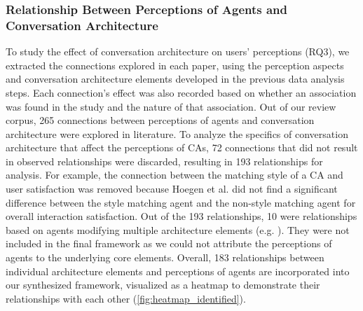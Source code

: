 \subsubsection*{Relationship Between Perceptions of Agents and Conversation Architecture}



To study the effect of conversation architecture on users' perceptions (RQ3), we extracted the connections explored in each paper, using the perception aspects and conversation architecture elements developed in the previous data analysis steps. Each connection's effect was also recorded based on whether an association was found in the study and the nature of that association. Out of our review corpus, 265 connections between perceptions of agents and conversation architecture were explored in literature. To analyze the specifics of conversation architecture that affect the perceptions of CAs, 72 connections that did not result in observed relationships were discarded, resulting in 193 relationships for analysis. For example, the connection between the matching style of a CA and user satisfaction was removed because Hoegen et al. \cite{hoegen2019end}\cmt{[31]} did not find a significant difference between the style matching agent and the non-style matching agent for overall interaction satisfaction. Out of the 193 relationships, 10 were relationships based on agents modifying multiple architecture elements (e.g. \cite{seeger2021chatbots, volkel2021manipulating}\cmt{[35][68]}). They were not included in the final framework as we could not attribute the perceptions of agents to the underlying core elements. Overall, 183 relationships between individual architecture elements and perceptions of agents are incorporated into our synthesized framework, visualized as a heatmap to demonstrate their relationships with each other (\autoref{fig:heatmap_identified}).